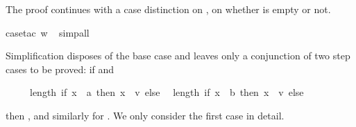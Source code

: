 \begin{isabellebody}
\begin{isamarkuptxt}
The proof continues with a case distinction on ,
on whether  is empty or not.%
\end{isamarkuptxt}%
\isamarkuptrue%
\isamarkupfalse%
{\isacharparenleft}case{\isacharunderscore}tac\ w{\isacharparenright}\isanewline
\ \isamarkupfalse%
{\isacharparenleft}simp{\isacharunderscore}all{\isacharparenright}%
\begin{isamarkuptxt}%
\noindent
Simplification disposes of the base case and leaves only a conjunction
of two step cases to be proved:
if  and \begin{isabelle}%
\ \ \ \ \ length\ {\isacharparenleft}if\ x\ {\isacharequal}\ a\ then\ {\isacharbrackleft}x\ {\isasymin}\ v{\isacharbrackright}\ else\ {\isacharbrackleft}{\isacharbrackright}{\isacharparenright}\ {\isacharequal}\isanewline
\isaindent{\ \ \ \ \ }length\ {\isacharparenleft}if\ x\ {\isacharequal}\ b\ then\ {\isacharbrackleft}x\ {\isasymin}\ v{\isacharbrackright}\ else\ {\isacharbrackleft}{\isacharbrackright}{\isacharparenright}\ {\isacharplus}\ {}%
\end{isabelle} then
, and similarly for .
We only consider the first case in detail.


\end{isamarkuptxt}
\end{isabellebody}
